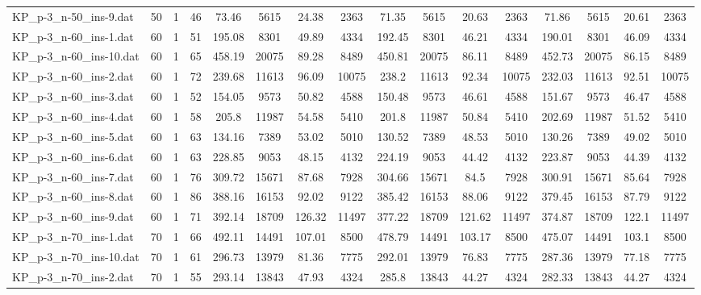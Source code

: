 \begin{sidewaystable}[!ht]
{\begin{tabular}{lccccccccccccccc}
KP\_p-3\_n-50\_ins-9.dat & 50 & 1 & 46 & 73.46 & 5615 & 24.38 & 2363 & 71.35 & 5615 & 20.63 & 2363 & 71.86 & 5615 & 20.61 & 2363 \\
KP\_p-3\_n-60\_ins-1.dat & 60 & 1 & 51 & 195.08 & 8301 & 49.89 & 4334 & 192.45 & 8301 & 46.21 & 4334 & 190.01 & 8301 &  \textcolor{blue2}{46.09} & 4334 \\
KP\_p-3\_n-60\_ins-10.dat & 60 & 1 & 65 & 458.19 & 20075 & 89.28 & 8489 & 450.81 & 20075 & 86.11 & 8489 & 452.73 & 20075 & 86.15 & 8489 \\
KP\_p-3\_n-60\_ins-2.dat & 60 & 1 & 72 & 239.68 & 11613 & 96.09 & 10075 & 238.2 & 11613 & 92.34 & 10075 & 232.03 & 11613 & 92.51 & 10075 \\
KP\_p-3\_n-60\_ins-3.dat & 60 & 1 & 52 & 154.05 & 9573 & 50.82 & 4588 & 150.48 & 9573 & 46.61 & 4588 & 151.67 & 9573 &  \textcolor{blue2}{46.47} & 4588 \\
KP\_p-3\_n-60\_ins-4.dat & 60 & 1 & 58 & 205.8 & 11987 & 54.58 & 5410 & 201.8 & 11987 &  \textcolor{blue2}{50.84} & 5410 & 202.69 & 11987 & 51.52 & 5410 \\
KP\_p-3\_n-60\_ins-5.dat & 60 & 1 & 63 & 134.16 & 7389 & 53.02 & 5010 & 130.52 & 7389 &  \textcolor{blue2}{48.53} & 5010 & 130.26 & 7389 & 49.02 & 5010 \\
KP\_p-3\_n-60\_ins-6.dat & 60 & 1 & 63 & 228.85 & 9053 & 48.15 & 4132 & 224.19 & 9053 & 44.42 & 4132 & 223.87 & 9053 & 44.39 & 4132 \\
KP\_p-3\_n-60\_ins-7.dat & 60 & 1 & 76 & 309.72 & 15671 & 87.68 & 7928 & 304.66 & 15671 &  \textcolor{blue2}{84.5} & 7928 & 300.91 & 15671 & 85.64 & 7928 \\
KP\_p-3\_n-60\_ins-8.dat & 60 & 1 & 86 & 388.16 & 16153 & 92.02 & 9122 & 385.42 & 16153 & 88.06 & 9122 & 379.45 & 16153 & 87.79 & 9122 \\
KP\_p-3\_n-60\_ins-9.dat & 60 & 1 & 71 & 392.14 & 18709 & 126.32 & 11497 & 377.22 & 18709 & 121.62 & 11497 & 374.87 & 18709 & 122.1 & 11497 \\
KP\_p-3\_n-70\_ins-1.dat & 70 & 1 & 66 & 492.11 & 14491 & 107.01 & 8500 & 478.79 & 14491 & 103.17 & 8500 & 475.07 & 14491 & 103.1 & 8500 \\
KP\_p-3\_n-70\_ins-10.dat & 70 & 1 & 61 & 296.73 & 13979 & 81.36 & 7775 & 292.01 & 13979 &  \textcolor{blue2}{76.83} & 7775 & 287.36 & 13979 & 77.18 & 7775 \\
KP\_p-3\_n-70\_ins-2.dat & 70 & 1 & 55 & 293.14 & 13843 & 47.93 & 4324 & 285.8 & 13843 & 44.27 & 4324 & 282.33 & 13843 & 44.27 & 4324 \\

\end{tabular}}
\end{sidewaystable}
